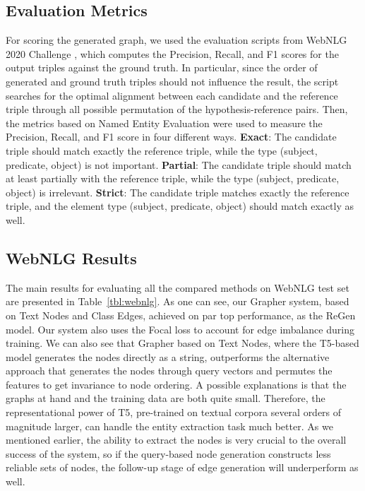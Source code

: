 \subsection{Evaluation Metrics}
For scoring the generated graph, we used the evaluation scripts from WebNLG 2020 Challenge \cite{Ferreira2020The2B}, which computes the Precision, Recall, and F1 scores for the output triples against the ground truth. In particular, since the order of generated and ground truth triples should not influence the result, the script searches for the optimal
alignment between each candidate and the reference triple through all possible permutation of the hypothesis-reference pairs. Then, the metrics based on Named Entity Evaluation \cite{SeguraBedmar2013SemEval2013T9} were used to measure the Precision, Recall, and F1 score in four different ways. \textbf{Exact}: The candidate triple should match exactly the reference triple, while the type (subject, predicate, object) is not important. \textbf{Partial}: The candidate triple should match at least partially with the reference
triple, while the type (subject, predicate, object) is irrelevant. \textbf{Strict}: The candidate triple matches exactly the reference triple, and the element type (subject, predicate, object) should match exactly as well. 

\subsection{WebNLG Results}


The main results for evaluating all the compared methods on WebNLG test set are presented in Table~\ref{tbl:webnlg}. As one can see, our Grapher system, based on Text Nodes and Class Edges, achieved on par top performance, as the ReGen \cite{dognin2021regen} model. Our system also uses the Focal loss to account for edge imbalance during training. We can also see that Grapher based on Text Nodes, where the T5-based model generates the nodes directly as a string, outperforms the alternative approach that generates the nodes through query vectors and permutes the features to get invariance to node ordering. A possible explanations is that the graphs at hand and the training data are both quite small. Therefore, the representational power of T5, pre-trained on textual corpora several orders of magnitude larger, can handle the entity extraction task much better. As we mentioned earlier, the ability to extract the nodes is very crucial to the overall success of the system, so if the query-based node generation constructs less reliable sets of nodes, the follow-up stage of edge generation will underperform as well.

